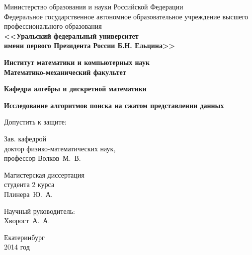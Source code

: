 \documentclass[12pt]{article}
\begin{document}
{\thispagestyle{empty}
\begin{center}
\scriptsize Министерство образования и науки Российской Федерации\\
\scriptsize Федеральное государственное автономное образовательное учреждение высшего профессионального образования\\
\small\bf <<Уральский федеральный университет\\
\small\bf имени первого Президента России Б.Н. Ельцина>>
\end{center}

\begin{center}
\normalsize\bf Институт математики и компьютерных наук\\
\normalsize\bf Математико-механический факультет\\
\end{center}
\begin{center}
\normalsize\bf Кафедра алгебры и дискретной математики\\
\end{center}

\vspace{3cm}

\begin{center}
\Large\bf Исследование алгоритмов поиска на сжатом представлении данных
\end{center}

\vspace{3.5cm}

\hspace{-1cm}
\begin{minipage}{80mm}
 \noindent
 \vspace{-2.3cm}
	\begin{flushleft}
		\normalsize Допустить к защите:\\
	\end{flushleft}
	
	\begin{flushleft}
		\normalsize Зав. кафедрой\\
		\normalsize доктор физико-математических наук,\\
		\normalsize профессор Волков~М.~В.
	\end{flushleft}
\end{minipage}
\begin{minipage}{85mm}
	\begin{flushright}
		\normalsize Магистерская диссертация\\
		\normalsize студента 2 курса\\
		\normalsize Плинера~Ю.~А.
	\end{flushright}
	
	\vspace{0.5cm}
	
	\begin{flushright}
		\normalsize Научный руководитель:\\
		\normalsize Хворост~А.~А.
	\end{flushright}
\end{minipage}

\vspace{4cm}

\begin{center}
Екатеринбург\\
2014 год
\end{center}

}
\end{document}
